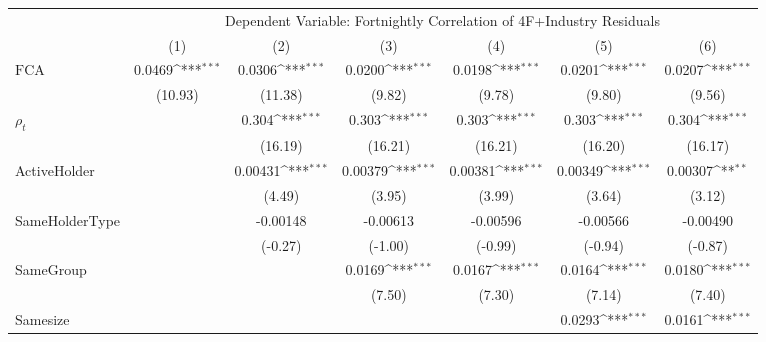 {
\def\sym#1{\ifmmode^{#1}\else\(^{#1}\)\fi}
\begin{tabular}{l*{6}{c}}
\hline\hline
 & \multicolumn{6}{c}{Dependent Variable: Fortnightly Correlation of 4F+Industry Residuals}                 \\
 \cline{2-7}
                    &\multicolumn{1}{c}{(1)}         &\multicolumn{1}{c}{(2)}         &\multicolumn{1}{c}{(3)}         &\multicolumn{1}{c}{(4)}         &\multicolumn{1}{c}{(5)}         &\multicolumn{1}{c}{(6)}         \\
\hline
$ \text{FCA} $      &      0.0469\sym{***}&      0.0306\sym{***}&      0.0200\sym{***}&      0.0198\sym{***}&      0.0201\sym{***}&      0.0207\sym{***}\\
                    &     (10.93)         &     (11.38)         &      (9.82)         &      (9.78)         &      (9.80)         &      (9.56)         \\
[1em]
$ \rho_t $          &                     &       0.304\sym{***}&       0.303\sym{***}&       0.303\sym{***}&       0.303\sym{***}&       0.304\sym{***}\\
                    &                     &     (16.19)         &     (16.21)         &     (16.21)         &     (16.20)         &     (16.17)         \\
[1em]
ActiveHolder        &                     &     0.00431\sym{***}&     0.00379\sym{***}&     0.00381\sym{***}&     0.00349\sym{***}&     0.00307\sym{**} \\
                    &                     &      (4.49)         &      (3.95)         &      (3.99)         &      (3.64)         &      (3.12)         \\
[1em]
SameHolderType            &                     &    -0.00148         &    -0.00613         &    -0.00596         &    -0.00566         &    -0.00490         \\
                    &                     &     (-0.27)         &     (-1.00)         &     (-0.99)         &     (-0.94)         &     (-0.87)         \\
[1em]
SameGroup           &                     &                     &      0.0169\sym{***}&      0.0167\sym{***}&      0.0164\sym{***}&      0.0180\sym{***}\\
                    &                     &                     &      (7.50)         &      (7.30)         &      (7.14)         &      (7.40)         \\
[1em]
Samesize            &                     &                     &                     &                     &      0.0293\sym{***}&      0.0161\sym{***}\\

\end{tabular}}
